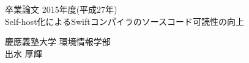 \begin{titlepage}
  \begin{center}
    \begin{large}
      卒業論文   2015年度(平成27年)\\
      \vspace{24pt}
      Self-host化によるSwiftコンパイラのソースコード可読性の向上
      \end{large}
  \end{center}
  \vspace{40em}
  \begin{flushright}
    \large 慶應義塾大学 環境情報学部\\
    出水 厚輝
  \end{flushright}
\end{titlepage}
